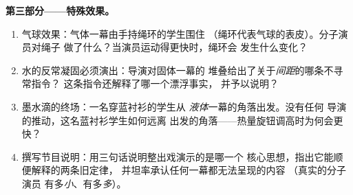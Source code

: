 \begin{problem}
\medskip\noindent\textbf{第三部分——特殊效果。}
\begin{enumerate}[resume]
  \item 气球效果：气体一幕由手持绳环的学生围住
        （绳环代表气球的表皮）。分子演员对绳子
        做了什么？当演员运动得更快时，绳环会
        发生什么变化？
  \item 水的反常凝固必须演出：导演对固体一幕的
        堆叠给出了关于\emph{间距}的哪条不寻常指令？
        这条指令还解释了哪一个漂浮事实，
        并予以说明？
  \item 墨水滴的终场：一名穿蓝衬衫的学生从
        \emph{液体}一幕的角落出发。没有任何
        导演的推动，这名蓝衬衫学生如何远离
        出发的角落——热量旋钮调高时为何会更快？
  \item 撰写节目说明：用三句话说明整出戏演示的是哪一个
        核心思想，指出它能顺便解释的两条旧定律，
        并坦率承认任何一幕都无法呈现的内容
        （真实的分子演员
        有多\emph{小}、有多\emph{多}）。
\end{enumerate}
\end{problem}
